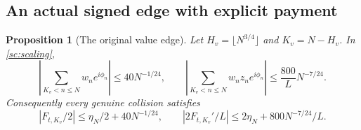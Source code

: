 \documentclass[11pt]{article}
\numberwithin{equation}{section}
\newtheorem{proposition}[theorem]{Proposition}
\theoremstyle{definition}
\theoremstyle{remark}
\begin{document}
\subsection{An actual signed edge with explicit payment}
\begin{proposition}[The original value edge]
\label{sc:valueedge}
Let $H_v=\lfloor N^{3/4}\rfloor$ and $K_v=N-H_v$.
In \eqref{sc:scaling},
\begin{equation}\label{sc:edgetails}
 \left|\sum_{K_v<n\le N}w_ne^{i\phi_n}\right|\le40N^{-1/24},
 \qquad
 \left|\sum_{K_v<n\le N}w_nz_ne^{i\phi_n}\right|
     \le\frac{800}{L}N^{-7/24}.
\end{equation}
Consequently every genuine collision satisfies
\begin{equation}\label{sc:edgecollision}
 |F_{t,K_v}/2|\le\eta_N/2+40N^{-1/24},\qquad
 |2F_{t,K_v}'/L|\le2\eta_N+800N^{-7/24}/L.
\end{equation}
\end{proposition}
\end{document}
